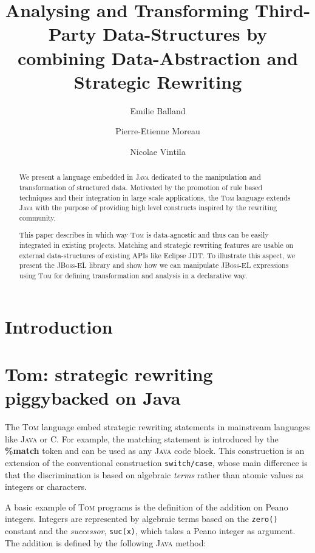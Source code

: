 \documentclass[runningheads]{llncs}
\title{Analysing and Transforming Third-Party Data-Structures by combining Data-Abstraction and Strategic Rewriting}
\author{Emilie Balland \and Pierre-Etienne Moreau \and Nicolae Vintila}
\institute{INRIA \& LORIA,\\
  BP 101, 54602 Villers-l{\`e}s-Nancy Cedex France\\
% 
\email{\{Emilie.Balland,Pierre-Etienne.Moreau\}@loria.fr,nick@domainspecificconsulting.com}
}
\newcommand{\jbossel}{\textsc{JBoss-EL}}
\newcommand{\tom}{\textsc{Tom}}
\newcommand{\java}{\textsc{Java}}
\newcommand{\C}{\textsf{C}}
\newcommand{\lex}[1]{{\textrm{\textbf{#1}}}}
\begin{document}
\maketitle

\begin{abstract}
We present a language embedded in {\java} dedicated to the manipulation and
transformation of structured data.  Motivated by the promotion of rule based
techniques and their integration in large scale applications, the {\tom}
language extends {\java} with the purpose of providing high level constructs
inspired by the rewriting community.

This paper describes in which way {\tom} is data-agnostic and thus can be
easily integrated in existing projects. Matching and strategic rewriting
features are usable on external data-structures of existing APIs like Eclipse
JDT. To illustrate this aspect, we present the {\jbossel} library and show how
we can manipulate {\jbossel} expressions using {\tom} for defining
transformation and analysis in a declarative way.
\end{abstract}

%
%

\section{Introduction}

\section{Tom: strategic rewriting piggybacked on Java}
	
The {\tom} language embed strategic rewriting statements in  mainstream
languages like {\java} or {\C}.  For example, the matching statement is
introduced by the \lex{\%match} token and can be used as any {\java} code
block.  This construction is an extension of the conventional construction
\texttt{switch/case}, whose main difference is that the discrimination is
based on algebraic \emph{terms} rather than atomic values as integers or
characters.

A basic example of {\tom} programs is the definition of the addition on Peano
integers. Integers are represented by algebraic terms based on the
\texttt{zero()} constant and the \emph{successor}, \texttt{suc(x)},  which
takes a Peano integer as argument.  The addition is defined by the following
{\java} method:
\end{document}
